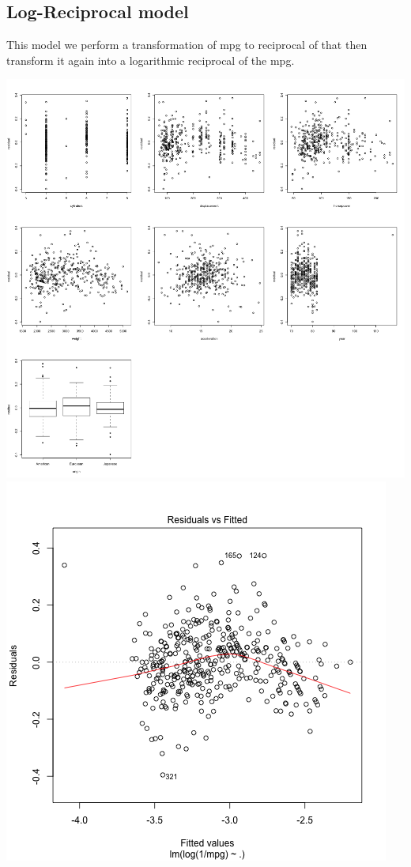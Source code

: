 \documentclass[11pt]{article} %
\begin{document}
\subsection{Log-Reciprocal model}
This model we perform a transformation of mpg to reciprocal of that then transform it again into a logarithmic reciprocal of the mpg.
\begin{center}
\includegraphics[scale=0.13]{5_res_vs_value}
\includegraphics[scale=0.3]{5_res_vs_fitted}
\end{center}
\end{document}

